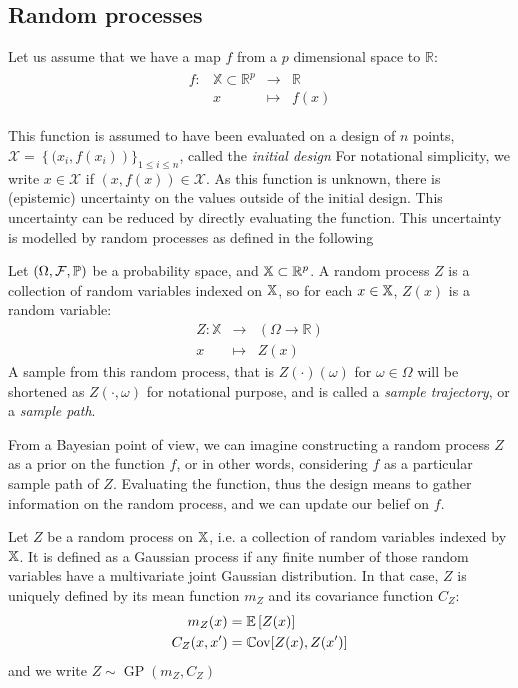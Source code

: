 \documentclass[../../Main_ManuscritThese.tex]{subfiles}
\newcommand{\GP}{\mathop{\mathrm{GP}}}
\begin{document}
\subsection{Random processes}
Let us assume that we have a map $f$ from a $p$ dimensional space to $\mathbb{R}$:
\begin{align}
  \begin{array}{rrcl}
    f: & \mathbb{X} \subset \mathbb{R}^p& \longrightarrow & \mathbb{R} \\
       & x & \longmapsto & f(x)
  \end{array}
\end{align}

This function is assumed to have been evaluated on a design of $n$ points, $\mathcal{X} = \left\{ (x_i, f(x_i) \right)\}_{1\leq i\leq n}$, called the \emph{initial design} For notational simplicity, we write $x\in \mathcal{X}$ if $(x, f(x)) \in \mathcal{X}$.
As this function is unknown, there is (epistemic) uncertainty on the values outside of the initial design. This uncertainty can be reduced by directly evaluating the function.
This uncertainty is modelled by random processes as defined in the following

\begin{definition}
  Let $(\Omega, \mathcal{F}, \mathbb{P})$ be a probability space, and $\mathbb{X}\subset \mathbb{R}^p$.
  A random process $Z$ is a collection of random variables indexed on $\mathbb{X}$, so for each $x \in \mathbb{X}$, $Z(x)$ is a random variable:
 \begin{equation}
  \begin{array}{rcl}
    Z: \mathbb{X} & \longrightarrow & \left(\Omega \rightarrow \mathbb{R} \right)\\
    x& \longmapsto & Z(x)
  \end{array}
\end{equation}
A sample from this random process, that is $Z(\cdot)(\omega)$ for $\omega \in \Omega$ will be shortened as $Z(\cdot, \omega)$ for notational purpose, and is called a \emph{sample trajectory}, or a \emph{sample path}.
\end{definition}
From a Bayesian point of view, we can imagine constructing a random process $Z$ as a prior on the function $f$, or in other words, considering $f$ as a particular sample path of $Z$. Evaluating the function, thus  the design means to gather information on the random process, and we can update our belief on $f$.


\begin{definition}
  Let $Z$ be a random process on $\mathbb{X}$, i.e. a collection of random variables indexed by $\mathbb{X}$. It is defined as a Gaussian process if any finite number of those random variables have a multivariate joint Gaussian distribution.
  In that case, $Z$ is uniquely defined by its mean function $m_Z$ and its covariance function $C_Z$:
  \begin{align}
    m_Z(x) &= \mathbb{E}\left[Z(x)\right] \\
    C_Z(x, x^{\prime}) &= \mathbb{C}\mathrm{ov}[Z(x), Z(x^{\prime})]
  \end{align}
  and we write $Z \sim \GP(m_Z, C_Z)$
\end{definition}
\end{document}
